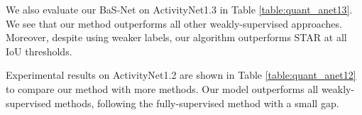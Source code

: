 \documentclass[letterpaper]{article} %
\newcommand{\Tref}[1]{Table \ref{#1}}
\begin{document}
We also evaluate our BaS-Net on ActivityNet1.3 in \Tref{table:quant_anet13}. We see that our method outperforms all other weakly-supervised approaches. Moreover, despite using weaker labels, our algorithm outperforms STAR at all IoU thresholds.

Experimental results on ActivityNet1.2 are shown in \Tref{table:quant_anet12} to compare our method with more methods. Our model outperforms all weakly-supervised methods, following the fully-supervised method with a small gap.

\begin{table}[t]
\caption{
Comparison with other methods on ActivityNet1.2 validation set. The column AVG shows the average mAP at IoU thresholds 0.5:0.05:0.95.
}
\begin{center}
\end{center}
\label{table:quant_anet12}
\end{table}

\begin{table}[t]
\caption{
Performances for detecting background frames on THUMOS'14 (F-measure).
}
\begin{center}
\end{center}
\label{table:ablation_fmeasure}
\end{table}
\end{document}
